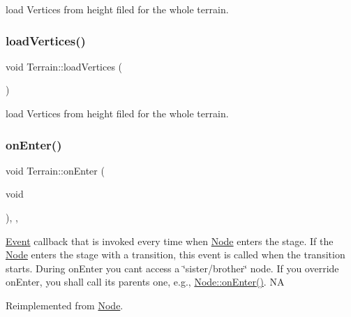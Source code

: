 load Vertices from height filed for the whole terrain. \mbox{\label{classTerrain_aac8d9ca975f6b0050c49f7cb3c2f37ad}} 
\subsubsection{\texorpdfstring{load\+Vertices()}{loadVertices()}\hspace{0.1cm}{\footnotesize\ttfamily [2/2]}}
{\footnotesize\ttfamily void Terrain\+::load\+Vertices (\begin{DoxyParamCaption}{ }\end{DoxyParamCaption})\hspace{0.3cm}{\ttfamily [protected]}}

load Vertices from height filed for the whole terrain. \mbox{\label{classTerrain_a464acea156d7aca981b7b459708f7d16}} 
\subsubsection{\texorpdfstring{on\+Enter()}{onEnter()}\hspace{0.1cm}{\footnotesize\ttfamily [1/2]}}
{\footnotesize\ttfamily void Terrain\+::on\+Enter (\begin{DoxyParamCaption}\item[{void}]{ }\end{DoxyParamCaption})\hspace{0.3cm}{\ttfamily [override]}, {\ttfamily [protected]}, {\ttfamily [virtual]}}

\hyperlink{classEvent}{Event} callback that is invoked every time when \hyperlink{classNode}{Node} enters the \textquotesingle{}stage\textquotesingle{}. If the \hyperlink{classNode}{Node} enters the \textquotesingle{}stage\textquotesingle{} with a transition, this event is called when the transition starts. During on\+Enter you can\textquotesingle{}t access a \char`\"{}sister/brother\char`\"{} node. If you override on\+Enter, you shall call its parent\textquotesingle{}s one, e.\+g., \hyperlink{classNode_a7f51764c4afd5018a052b9ef71c03374}{Node\+::on\+Enter()}.  NA 

Reimplemented from \hyperlink{classNode_a7f51764c4afd5018a052b9ef71c03374}{Node}.

